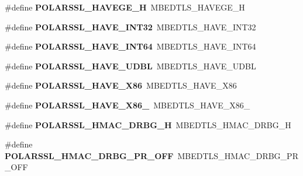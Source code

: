 \begin{DoxyCompactItemize}
\mbox{\label{compat-1_83_8h_a85a5b3d991d311ca52fae1edd9ea60db}} 
\#define {\bfseries P\+O\+L\+A\+R\+S\+S\+L\+\_\+\+H\+A\+V\+E\+G\+E\+\_\+H}~M\+B\+E\+D\+T\+L\+S\+\_\+\+H\+A\+V\+E\+G\+E\+\_\+H
\item 
\mbox{\label{compat-1_83_8h_aaa32170d1fc407e0be9ddbce62871c74}} 
\#define {\bfseries P\+O\+L\+A\+R\+S\+S\+L\+\_\+\+H\+A\+V\+E\+\_\+\+I\+N\+T32}~M\+B\+E\+D\+T\+L\+S\+\_\+\+H\+A\+V\+E\+\_\+\+I\+N\+T32
\item 
\mbox{\label{compat-1_83_8h_a46172cc109d3f61ecda014599756e020}} 
\#define {\bfseries P\+O\+L\+A\+R\+S\+S\+L\+\_\+\+H\+A\+V\+E\+\_\+\+I\+N\+T64}~M\+B\+E\+D\+T\+L\+S\+\_\+\+H\+A\+V\+E\+\_\+\+I\+N\+T64
\item 
\mbox{\label{compat-1_83_8h_a4f497e14fe66e1d321e4edb73126908b}} 
\#define {\bfseries P\+O\+L\+A\+R\+S\+S\+L\+\_\+\+H\+A\+V\+E\+\_\+\+U\+D\+BL}~M\+B\+E\+D\+T\+L\+S\+\_\+\+H\+A\+V\+E\+\_\+\+U\+D\+BL
\item 
\mbox{\label{compat-1_83_8h_acf30fb0de425e04a16d976a9346fa496}} 
\#define {\bfseries P\+O\+L\+A\+R\+S\+S\+L\+\_\+\+H\+A\+V\+E\+\_\+\+X86}~M\+B\+E\+D\+T\+L\+S\+\_\+\+H\+A\+V\+E\+\_\+\+X86
\item 
\mbox{\label{compat-1_83_8h_ad29140299bc5440f18bbae5380dbc184}} 
\#define {\bfseries P\+O\+L\+A\+R\+S\+S\+L\+\_\+\+H\+A\+V\+E\+\_\+\+X86\+\_}~M\+B\+E\+D\+T\+L\+S\+\_\+\+H\+A\+V\+E\+\_\+\+X86\+\_
\item 
\mbox{\label{compat-1_83_8h_aefeba0ff172b95c6a16b904cf566fd24}} 
\#define {\bfseries P\+O\+L\+A\+R\+S\+S\+L\+\_\+\+H\+M\+A\+C\+\_\+\+D\+R\+B\+G\+\_\+H}~M\+B\+E\+D\+T\+L\+S\+\_\+\+H\+M\+A\+C\+\_\+\+D\+R\+B\+G\+\_\+H
\item 
\mbox{\label{compat-1_83_8h_a1df2abd47fc8c24f9ce5c02c86337dad}} 
\#define {\bfseries P\+O\+L\+A\+R\+S\+S\+L\+\_\+\+H\+M\+A\+C\+\_\+\+D\+R\+B\+G\+\_\+\+P\+R\+\_\+\+O\+FF}~M\+B\+E\+D\+T\+L\+S\+\_\+\+H\+M\+A\+C\+\_\+\+D\+R\+B\+G\+\_\+\+P\+R\+\_\+\+O\+FF
\item 
\mbox{\label{compat-1_83_8h_a48149f1fd6d91c46a1a4f1574cd65653}} 

\end{DoxyCompactItemize}
